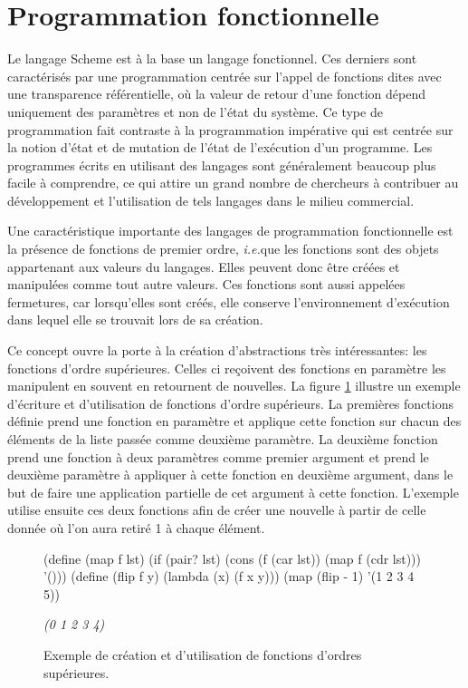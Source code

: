 \documentclass[12pt,oneside,letterpaper,francais]{book}
\newcommand{\ie}{{\textit{i.e.}}}
\newcommand{\schemeresult}[1]{{\it #1}}
\begin{document}
\section{Programmation fonctionnelle}
Le langage Scheme est à la base un langage fonctionnel. Ces derniers
sont caractérisés par une programmation centrée sur l'appel de
fonctions dites avec une transparence référentielle, où la valeur de
retour d'une fonction dépend uniquement des paramètres et non de
l'état du système. Ce type de programmation fait contraste à la
programmation impérative qui est centrée sur la notion d'état et de
mutation de l'état de l'exécution d'un programme. Les programmes
écrits en utilisant des langages sont généralement beaucoup plus
facile à comprendre, ce qui attire un grand nombre de chercheurs à
contribuer au développement et l'utilisation de tels langages dans le
milieu commercial.

Une caractéristique importante des langages de programmation
fonctionnelle est la présence de fonctions de premier ordre, \ie que
les fonctions sont des objets appartenant aux valeurs du
langages. Elles peuvent donc être créées et manipulées comme tout
autre valeurs. Ces fonctions sont aussi appelées fermetures, car
lorsqu'elles sont créés, elle conserve l'environnement d'exécution
dans lequel elle se trouvait lors de sa création. 

Ce concept ouvre la porte à la création d'abstractions très
intéressantes: les fonctions d'ordre supérieures. Celles ci reçoivent
des fonctions en paramètre les manipulent en souvent en retournent de
nouvelles. La figure \ref{FIG:hof} illustre un exemple d'écriture et
d'utilisation de fonctions d'ordre supérieurs. La premières fonctions
définie prend une fonction en paramètre et applique cette fonction sur
chacun des éléments de la liste passée comme deuxième paramètre. La
deuxième fonction prend une fonction à deux paramètres comme premier
argument et prend le deuxième paramètre à appliquer à cette fonction
en deuxième argument, dans le but de faire une application partielle
de cet argument à cette fonction. L'exemple utilise ensuite ces deux
fonctions afin de créer une nouvelle à partir de celle donnée où l'on
aura retiré 1 à chaque élément.\\

\begin{figure}[htb!]
  \begin{schemecode}
(define (map f lst)
    (if (pair? lst)
        (cons (f (car lst)) (map f (cdr lst)))
        '()))
(define (flip f y)
    (lambda (x) (f x y)))
(map (flip - 1) '(1 2 3 4 5))
  \end{schemecode}
  \schemeresult{(0 1 2 3 4)}
  \caption{Exemple de création et d'utilisation de fonctions d'ordres
    supérieures.}
  \label{FIG:hof}
\end{figure}
\end{document}
